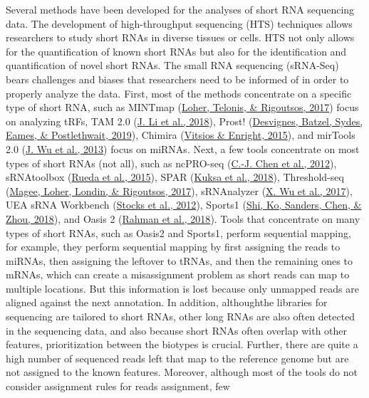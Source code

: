 \documentclass[12pt,twoside]{reedthesis}
\begin{document}
Several methods have been developed for the analyses of short RNA
sequencing data. The development of high-throughput sequencing (HTS)
techniques allows researchers to study short RNAs in diverse tissues or
cells. HTS not only allows for the quantification of known short RNAs
but also for the identification and quantification of novel short RNAs.
The small RNA sequencing (sRNA-Seq) bears challenges and biases that
researchers need to be informed of in order to properly analyze the
data. First, most of the methods concentrate on a specific type of short
RNA, such as MINTmap (\protect\hyperlink{ref-loher2017}{Loher, Telonis, \& Rigoutsos, 2017}) focus on analyzing tRFs, TAM 2.0
(\protect\hyperlink{ref-li2018}{J. Li et al., 2018}), Prost! (\protect\hyperlink{ref-desvignes2019}{Desvignes, Batzel, Sydes, Eames, \& Postlethwait, 2019}), Chimira (\protect\hyperlink{ref-vitsios2015}{Vitsios \& Enright, 2015}), and mirTools
2.0 (\protect\hyperlink{ref-wu2013}{J. Wu et al., 2013}) focus on miRNAs. Next, a few tools concentrate on most
types of short RNAs (not all), such as ncPRO-seq (\protect\hyperlink{ref-chen2012}{C.-J. Chen et al., 2012}),
sRNAtoolbox (\protect\hyperlink{ref-rueda2015}{Rueda et al., 2015}), SPAR (\protect\hyperlink{ref-kuksa2018}{Kuksa et al., 2018}), Threshold-seq (\protect\hyperlink{ref-magee2017}{Magee, Loher, Londin, \& Rigoutsos, 2017}),
sRNAnalyzer (\protect\hyperlink{ref-wu2017}{X. Wu et al., 2017}), UEA sRNA Workbench (\protect\hyperlink{ref-stocks2012}{Stocks et al., 2012}), Sports1
(\protect\hyperlink{ref-shi2018}{Shi, Ko, Sanders, Chen, \& Zhou, 2018}), and Oasis 2 (\protect\hyperlink{ref-rahman2018}{Rahman et al., 2018}). Tools that concentrate on many
types of short RNAs, such as Oasis2 and Sports1, perform sequential
mapping, for example, they perform sequential mapping by first assigning
the reads to miRNAs, then assigning the leftover to tRNAs, and then the
remaining ones to mRNAs, which can create a misassignment problem as
short reads can map to multiple locations. But this information is lost
because only unmapped reads are aligned against the next annotation. In
addition, althoughthe libraries for sequencing are tailored to short
RNAs, other long RNAs are also often detected in the sequencing data,
and also because short RNAs often overlap with other features,
prioritization between the biotypes is crucial. Further, there are quite
a high number of sequenced reads left that map to the reference genome
but are not assigned to the known features. Moreover, although most of
the tools do not consider assignment rules for reads assignment, few
\end{document}
